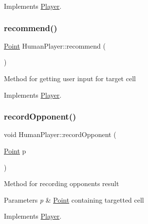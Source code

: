 Implements \mbox{\hyperlink{class_player_ab89c1180c7314d3e19bcf4b2bed2e02a}{Player}}.

\mbox{\label{class_human_player_a718f16f3ddeeb34c9f2e93cf1d805b46}} 
\subsubsection{\texorpdfstring{recommend()}{recommend()}}
{\footnotesize\ttfamily \mbox{\hyperlink{class_point}{Point}} Human\+Player\+::recommend (\begin{DoxyParamCaption}{ }\end{DoxyParamCaption})\hspace{0.3cm}{\ttfamily [virtual]}}

Method for getting user input for target cell 

Implements \mbox{\hyperlink{class_player_a2cc7a83d11158eafd8d49d4b9f23ce56}{Player}}.

\mbox{\label{class_human_player_a16b18f42e02d7c8d1f0971ce5e91595f}} 
\subsubsection{\texorpdfstring{record\+Opponent()}{recordOpponent()}}
{\footnotesize\ttfamily void Human\+Player\+::record\+Opponent (\begin{DoxyParamCaption}\item[{\mbox{\hyperlink{class_point}{Point}}}]{p }\end{DoxyParamCaption})\hspace{0.3cm}{\ttfamily [virtual]}}

Method for recording opponent\textquotesingle{}s result 
\begin{DoxyParams}{Parameters}
{\em p} & \mbox{\hyperlink{class_point}{Point}} containing targetted cell \\
\hline
\end{DoxyParams}


Implements \mbox{\hyperlink{class_player_a768e14edee61e208e6fd295cdd72a49c}{Player}}.

\mbox{\label{class_human_player_a19be81244b7a1c88a3ca89d207055b6e}} 
